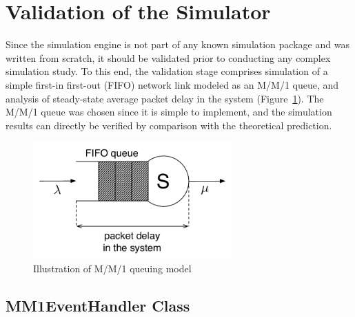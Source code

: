 \section{Validation of the Simulator}
\label{sec:validation_of_the_simulator_simappendix}
Since the simulation engine is not part of any known simulation package and was written from scratch, it should be validated prior to conducting any complex simulation study. To this end, the validation stage comprises simulation of a simple first-in first-out (FIFO) network link modeled as an M/M/1 queue, and analysis of steady-state average packet delay in the system (Figure~\ref{fig:mm1_queue_simappendix}). The M/M/1 queue was chosen since it is simple to implement, and the simulation results can directly be verified by comparison with the theoretical prediction.

\begin{figure}[t]
	\includegraphics[width=3in]{Appendices/Figures/mm1_queue}
	\caption{Illustration of M/M/1 queuing model}
	\label{fig:mm1_queue_simappendix}
\end{figure}

\subsection{MM1EventHandler Class}
\label{sub:mm1eventhandler_class_simappendix}

